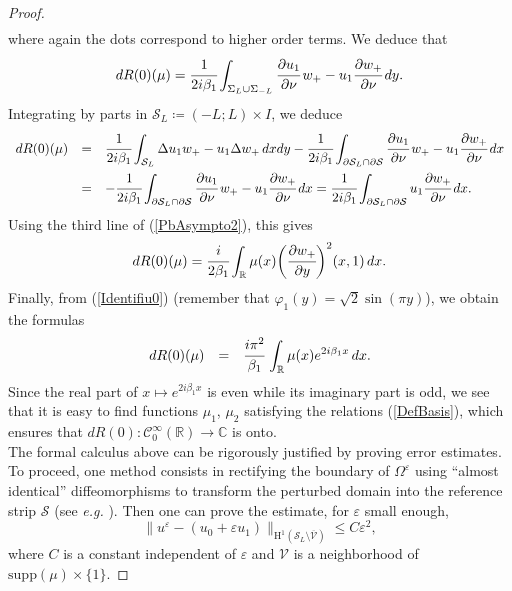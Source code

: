 \documentclass[11pt,a4paper]{report}
\newcommand{\dsp}{\displaystyle}
\newcommand{\eps}{\varepsilon}
\newcommand{\Om}{\Omega}
\newcommand{\mrm}[1]{\mathrm{#1}}
\newcommand{\Cplx}{\mathbb{C}}
\newcommand{\R}{\mathbb{R}}
\newcommand{\mH}{\mrm{H}}
\begin{document}
\begin{proof}
\[\begin{array}{rcl}
\end{array}
\]
where again the dots correspond to higher order terms. We deduce that 
\[
dR(0)(\mu)=\cfrac{1}{2i\beta_1}\dsp\int_{\Sigma_{L}\cup \Sigma_{-L}}\cfrac{\partial u_1}{\partial \nu}\,w_+-u_1\cfrac{\partial w_+}{\partial \nu}\,dy.
\]
Integrating by parts in $\mathcal{S}_L\coloneqq(-L;L)\times I$, we deduce
\[
\begin{array}{rcl}
dR(0)(\mu)&=&\dsp\cfrac{1}{2i\beta_1}\int_{\mathcal{S}_L} \Delta u_1 w_+-u_1\Delta w_+\,dxdy-\cfrac{1}{2i\beta_1}\dsp\int_{\partial \mathcal{S}_L\cap\partial \mathcal{S}}\cfrac{\partial u_1}{\partial \nu}\,w_+-u_1\cfrac{\partial w_+}{\partial \nu}\,dx \\[10pt]
& = & -\cfrac{1}{2i\beta_1}\dsp\int_{\partial \mathcal{S}_L\cap\partial \mathcal{S}}\cfrac{\partial u_1}{\partial \nu}\,w_+-u_1\cfrac{\partial w_+}{\partial \nu}\,dx=\cfrac{1}{2i\beta_1}\dsp\int_{\partial \mathcal{S}_L\cap\partial \mathcal{S}}u_1\cfrac{\partial w_+}{\partial \nu}\,dx.
\end{array}
\]
Using the third line of (\ref{PbAsympto2}), this gives
\[
dR(0)(\mu)= \cfrac{i}{2\beta_1}\dsp\int_{\R } \mu(x) \bigg(\cfrac{\partial w_+}{\partial y}\bigg)^2(x,1)\,dx.
\]
Finally, from (\ref{Identifiu0}) (remember that $\varphi_1(y)=\sqrt{2}\sin(\pi y)$), we obtain the formulas 
\[
\begin{array}{rcl}
dR(0)(\mu)&=&\dsp\cfrac{i \pi^2}{\beta_1}\,\int_{\R}\mu(x) e^{2i\beta_1x}\,dx.
\end{array}
\]
Since the real part of $x\mapsto e^{2i\beta_1 x}$ is even while its imaginary part is odd, we see that it is easy to find functions $\mu_1$, $\mu_2$ satisfying the relations (\ref{DefBasis}), which ensures that $dR(0):\mathscr{C}^\infty_0(\R)\to\Cplx$ is onto.\\ 
\newline
The formal calculus above can be rigorously justified by proving error estimates. To proceed, one method consists in rectifying the boundary of $\Om^\eps$ using ``almost identical'' diffeomorphisms to transform the perturbed domain into the reference strip $\mathcal{S}$ (see \textit{e.g.} \cite[Chap.\,7,\,\S6.5]{Kato95}). Then one can prove the estimate, for $\eps$ small enough,
\[
\|u^\eps-(u_0+\eps u_1)\|_{\mH^1(\mathcal{S}_L\setminus\overline{\mathcal{V}})} \le C\eps^2,
\]
where $C$ is a constant independent of $\eps$ and $\mathcal{V}$ is a neighborhood of $\mrm{supp}(\mu)\times\{1\}$.
\end{proof}
\end{document}
